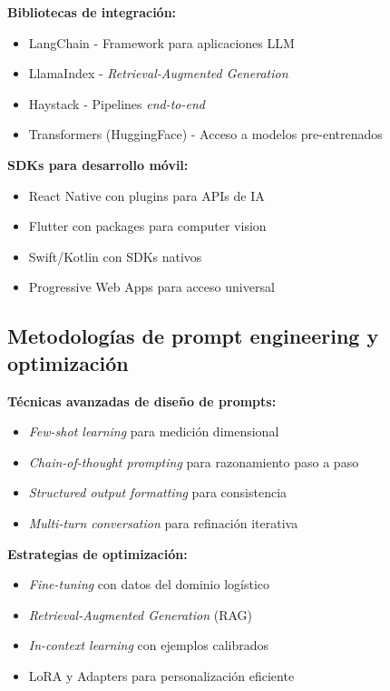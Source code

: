 \textbf{Bibliotecas de integración:}
\begin{itemize}
    \item LangChain - Framework para aplicaciones LLM
    \item LlamaIndex - \textit{Retrieval-Augmented Generation}
    \item Haystack - Pipelines \textit{end-to-end}
    \item Transformers (HuggingFace) - Acceso a modelos pre-entrenados
\end{itemize}

\textbf{SDKs para desarrollo móvil:}
\begin{itemize}
    \item React Native con plugins para APIs de IA
    \item Flutter con packages para computer vision
    \item Swift/Kotlin con SDKs nativos
    \item Progressive Web Apps para acceso universal
\end{itemize}

\subsection{Metodologías de prompt engineering y optimización}

\textbf{Técnicas avanzadas de diseño de prompts:}
\begin{itemize}
    \item \textit{Few-shot learning} para medición dimensional
    \item \textit{Chain-of-thought prompting} para razonamiento paso a paso
    \item \textit{Structured output formatting} para consistencia
    \item \textit{Multi-turn conversation} para refinación iterativa
\end{itemize}

\textbf{Estrategias de optimización:}
\begin{itemize}
    \item \textit{Fine-tuning} con datos del dominio logístico
    \item \textit{Retrieval-Augmented Generation} (RAG)
    \item \textit{In-context learning} con ejemplos calibrados
    \item LoRA y Adapters para personalización eficiente
\end{itemize}

